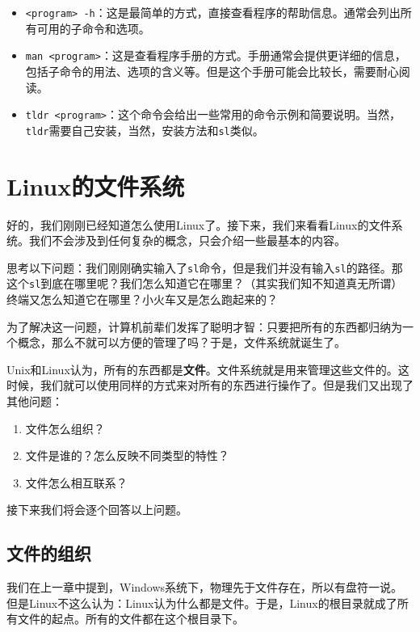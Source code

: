 \documentclass[../main.tex]{subfiles}
\begin{document}
\begin{itemize}
    \item \texttt{<program> -h}：这是最简单的方式，直接查看程序的帮助信息。通常会列出所有可用的子命令和选项。
    \item \texttt{man <program>}：这是查看程序手册的方式。手册通常会提供更详细的信息，包括子命令的用法、选项的含义等。但是这个手册可能会比较长，需要耐心阅读。
    \item \texttt{tldr <program>}：这个命令会给出一些常用的命令示例和简要说明。当然，\texttt{tldr}需要自己安装，当然，安装方法和\texttt{sl}类似。
\end{itemize}

\section{Linux的文件系统}

好的，我们刚刚已经知道怎么使用Linux了。接下来，我们来看看Linux的文件系统。我们不会涉及到任何复杂的概念，只会介绍一些最基本的内容。

思考以下问题：我们刚刚确实输入了\texttt{sl}命令，但是我们并没有输入\texttt{sl}的路径。那这个\texttt{sl}到底在哪里呢？我们怎么知道它在哪里？（其实我们知不知道真无所谓）终端又怎么知道它在哪里？小火车又是怎么跑起来的？

为了解决这一问题，计算机前辈们发挥了聪明才智：只要把所有的东西都归纳为一个概念，那么不就可以方便的管理了吗？于是，文件系统就诞生了。

Unix和Linux认为，所有的东西都是\textbf{文件}。文件系统就是用来管理这些文件的。这时候，我们就可以使用同样的方式来对所有的东西进行操作了。但是我们又出现了其他问题：

\begin{enumerate}
    \item 文件怎么组织？
    \item 文件是谁的？怎么反映不同类型的特性？
    \item 文件怎么相互联系？
\end{enumerate}

接下来我们将会逐个回答以上问题。

\subsection{文件的组织}

我们在上一章中提到，Windows系统下，物理先于文件存在，所以有盘符一说。但是Linux不这么认为：Linux认为什么都是文件。于是，Linux的根目录\text{/}就成了所有文件的起点。所有的文件都在这个根目录下。
\end{document}
